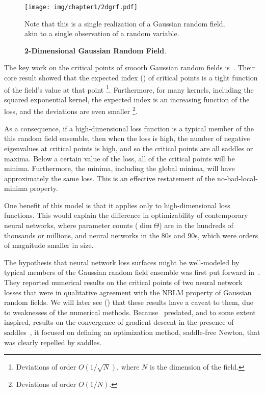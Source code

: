 \documentclass[../../thesis.tex]{subfiles}
\begin{document}
\begin{figure}[h]
	\begin{center}
		\texttt{[image: img/chapter1/2dgrf.pdf]}
	\end{center}
	\caption%
	{\textbf{2-Dimensional Gaussian Random Field}.}
	{Note that this is a single realization of a Gaussian random field,
	akin to a single observation of a random variable.}
\end{figure}

The key work on the critical points of smooth Gaussian random fields
is~\cite{bray2007}.
Their core result showed
that the expected index () of critical points
is a tight function of the field's value at that point%
\footnote{Deviations of order $O(1/\sqrt{N})$,
where $N$ is the dimension of the field.}.
Furthermore, for many kernels,
including the squared exponential kernel,
the expected index is an increasing function of the loss,
and the deviations are even smaller%
\footnote{Deviations of order $O(1/N)$.}.

As a consequence, if a high-dimensional loss function is a typical member of the
this random field ensemble, then
when the loss is high,
the number of negative eigenvalues at critical points is high,
and so the critical points are all saddles or maxima.
Below a certain value of the loss,
all of the critical points will be minima.
Furthermore,
the minima, including the global minima,
will have approximately the same loss.
This is an effective restatement
of the no-bad-local-minima property.

One benefit of this model is that it
applies only to high-dimensional loss functions.
This would explain the difference in optimizability
of contemporary neural networks,
where parameter counts ($\dim \Theta$)
are in the hundreds of thousands or millions,
and neural networks in the 80s and 90s,
which were orders of magnitude smaller in size.

The hypothesis that neural network loss surfaces
might be well-modeled by typical members
of the Gaussian random field ensemble
was first put forward in~\cite{dauphin2014}.
They reported numerical results on the critical points
of two neural network losses that were in qualitative
agreement with the NBLM property
of Gaussian random fields.
We will later see ()
that these results have a caveat to them,
due to weaknesses of the numerical methods.
Because~\cite{dauphin2014} predated,
and to some extent inspired,
results on the convergence of gradient descent
in the presence of saddles~\cite{lee2016,jin2018a},
it focused on defining an optimization method,
saddle-free Newton,
that was clearly repelled by saddles.
\end{document}
